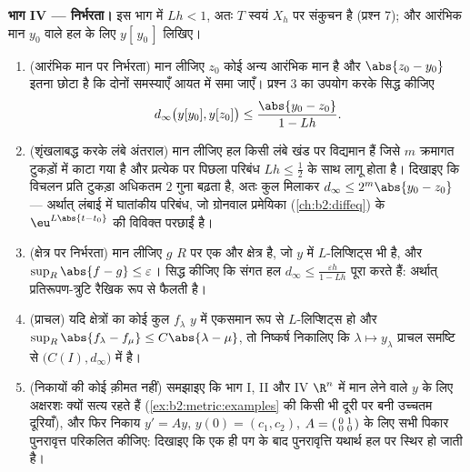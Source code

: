 \begin{problem}[{सप्ताहांत समस्या --- पिकार--लिंडलोफ़
प्रमेय}]
\medskip
\noindent\textbf{भाग IV ---  निर्भरता।} इस भाग में $Lh < 1$, अतः $T$
स्वयं $X_h$ पर संकुचन है (प्रश्न 7); और आरंभिक मान $y_0$ वाले हल के लिए
$y[\,y_0\,]$ लिखिए।
\begin{enumerate}[resume]
  \item (आरंभिक मान पर निर्भरता) मान लीजिए $z_0$ कोई अन्य आरंभिक मान है
        और $\abs{z_0 - y_0}$ इतना छोटा है कि दोनों समस्याएँ आयत में समा जाएँ। प्रश्न
        3 का उपयोग करके सिद्ध कीजिए
        \[
        d_\infty\bigl(y[y_0], y[z_0]\bigr) \leq
        \frac{\abs{y_0 - z_0}}{1 - Lh}.
        \]
  \item (शृंखलाबद्ध करके लंबे अंतराल) मान लीजिए हल किसी लंबे खंड पर
        विद्यमान हैं जिसे $m$ क्रमागत टुकड़ों में काटा गया है और
        प्रत्येक पर पिछला परिबंध $Lh \leq
        \frac12$ के साथ लागू होता है। दिखाइए कि
        विचलन प्रति टुकड़ा अधिकतम $2$ गुना बढ़ता है, अतः कुल मिलाकर
        $d_\infty \leq 2^m\abs{y_0 - z_0}$ --- अर्थात् लंबाई में घातांकीय परिबंध, जो ग्रोनवाल
        प्रमेयिका (\cref{ch:b2:diffeq}) के $\eu^{L\abs{t - t_0}}$ की विविक्त परछाईं है।
  \item (क्षेत्र पर निर्भरता) मान लीजिए $g$ $R$ पर एक और क्षेत्र है,
        जो $y$ में $L$-लिप्शिट्स भी है, और $\sup_R \abs{f - g}
        \leq \varepsilon$। सिद्ध कीजिए कि
        संगत हल $d_\infty \leq
        \frac{\varepsilon h}{1 - Lh}$ पूरा करते हैं: अर्थात् प्रतिरूपण-त्रुटि रैखिक
        रूप से फैलती है।
  \item (प्राचल) यदि क्षेत्रों का कोई कुल $f_\lambda$ $y$ में एकसमान रूप से
        $L$-लिप्शिट्स हो और $\sup_R\abs{f_\lambda
        - f_\mu} \leq C\abs{\lambda - \mu}$, तो निष्कर्ष निकालिए कि $\lambda \mapsto y_\lambda$ प्राचल
        समष्टि से $\bigl(C(I), d_\infty\bigr)$ में  है।
  \item (निकायों की कोई क़ीमत नहीं) समझाइए कि भाग I, II और IV $\R^n$ में
        मान लेने वाले $y$ के लिए अक्षरशः क्यों सत्य रहते हैं (\cref{ex:b2:metric:examples} की
        किसी भी दूरी पर बनी उच्चतम दूरियाँ), और फिर निकाय $y' = Ay$, $y(0) = (c_1,
        c_2)$,
        $A = \begin{psmallmatrix} 0 & 1\\ 0 &
        0\end{psmallmatrix}$ के लिए सभी पिकार पुनरावृत्त परिकलित कीजिए: दिखाइए कि एक
        ही पग के बाद पुनरावृत्ति यथार्थ हल पर स्थिर हो जाती है।
\end{enumerate}


\end{problem}
